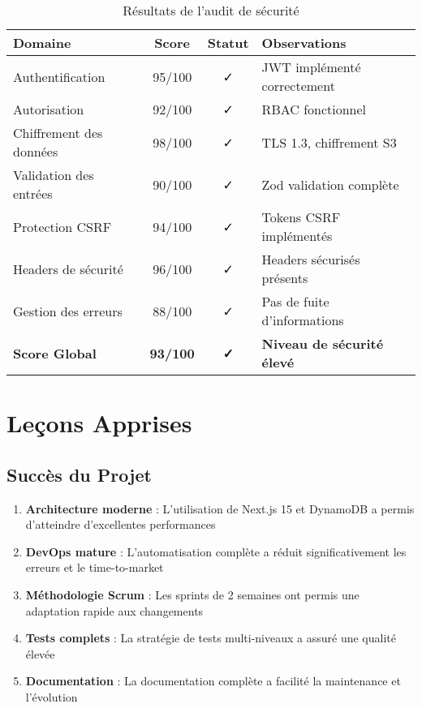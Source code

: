 \begin{table}[H]
    \centering
    \begin{tabularx}{\textwidth}{|l|c|c|X|}
        \hline
        \textbf{Domaine} & \textbf{Score} & \textbf{Statut} & \textbf{Observations} \\
        \hline
        Authentification & 95/100 & ✓ & JWT implémenté correctement \\
        \hline
        Autorisation & 92/100 & ✓ & RBAC fonctionnel \\
        \hline
        Chiffrement des données & 98/100 & ✓ & TLS 1.3, chiffrement S3 \\
        \hline
        Validation des entrées & 90/100 & ✓ & Zod validation complète \\
        \hline
        Protection CSRF & 94/100 & ✓ & Tokens CSRF implémentés \\
        \hline
        Headers de sécurité & 96/100 & ✓ & Headers sécurisés présents \\
        \hline
        Gestion des erreurs & 88/100 & ✓ & Pas de fuite d'informations \\
        \hline
        \textbf{Score Global} & \textbf{93/100} & \textbf{✓} & \textbf{Niveau de sécurité élevé} \\
        \hline
    \end{tabularx}
    \caption{Résultats de l'audit de sécurité}
    \label{tab:security_audit}
\end{table}

\section{Leçons Apprises}

\subsection{Succès du Projet}

\begin{enumerate}
    \item \textbf{Architecture moderne} : L'utilisation de Next.js 15 et DynamoDB a permis d'atteindre d'excellentes performances
    \item \textbf{DevOps mature} : L'automatisation complète a réduit significativement les erreurs et le time-to-market
    \item \textbf{Méthodologie Scrum} : Les sprints de 2 semaines ont permis une adaptation rapide aux changements
    \item \textbf{Tests complets} : La stratégie de tests multi-niveaux a assuré une qualité élevée
    \item \textbf{Documentation} : La documentation complète a facilité la maintenance et l'évolution
\end{enumerate}

